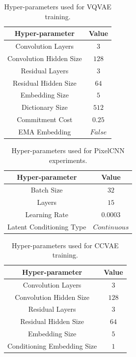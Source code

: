 \documentclass[letterpaper, 10 pt, conference]{ieeeconf}  %
\begin{document}
\begin{table}[h!]
    \centering
    \begin{tabular}{c|c}
    \hline
    \textbf{Hyper-parameter} & \textbf{Value} \\
    \hline
    Convolution Layers & $3$\\
    Convolution Hidden Size & $128$\\
    Residual Layers & $3$\\
    Residual Hidden Size & $64$\\
    Embedding Size & $5$\\
    Dictionary Size & $512$\\
    Commitment Cost & $0.25$\\
    EMA Embedding & $False$\\
    \hline
    \end{tabular}
\caption{Hyper-parameters used for VQVAE training.}
\label{table:vqvae-hyperparams}
\end{table}

\begin{table}[h!]
    \centering
    \begin{tabular}{c|c}
    \hline
    \textbf{Hyper-parameter} & \textbf{Value} \\
    \hline
    Batch Size & $32$\\
    Layers & $15$\\
    Learning Rate & $0.0003$\\
    Latent Conditioning Type & $Continuous$\\
    \hline
    \end{tabular}
\caption{Hyper-parameters used for PixelCNN experiments.}
\label{table:pixelcnn-hyperparams}
\end{table}

\begin{table}[h!]
    \centering
    \begin{tabular}{c|c}
    \hline
    \textbf{Hyper-parameter} & \textbf{Value} \\
    \hline
    Convolution Layers & $3$\\
    Convolution Hidden Size & $128$\\
    Residual Layers & $3$\\
    Residual Hidden Size & $64$\\
    Embedding Size & $5$\\
    Conditioning Embedding Size & $1$\\
    \hline
    \end{tabular}
\caption{Hyper-parameters used for CCVAE training.}
\label{table:ccvae-hyperparams}
\end{table}
\end{document}
